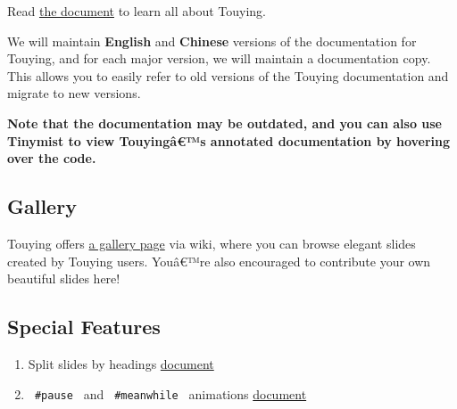Read \href{https://touying-typ.github.io/}{the document} to learn all
about Touying.

We will maintain \textbf{English} and \textbf{Chinese} versions of the
documentation for Touying, and for each major version, we will maintain
a documentation copy. This allows you to easily refer to old versions of
the Touying documentation and migrate to new versions.

\textbf{Note that the documentation may be outdated, and you can also
use Tinymist to view Touyingâ€™s annotated documentation by hovering
over the code.}

\subsection{Gallery}\label{gallery}

Touying offers \href{https://github.com/touying-typ/touying/wiki}{a
gallery page} via wiki, where you can browse elegant slides created by
Touying users. Youâ€™re also encouraged to contribute your own beautiful
slides here!

\subsection{Special Features}\label{special-features}

\begin{enumerate}
\tightlist
\item
  Split slides by headings
  \href{https://touying-typ.github.io/docs/sections}{document}
\end{enumerate}

\begin{Shaded}
\begin{Highlighting}[]





\end{Highlighting}
\end{Shaded}

\begin{enumerate}
\setcounter{enumi}{1}
\tightlist
\item
  \texttt{\ \#pause\ } and \texttt{\ \#meanwhile\ } animations
  \href{https://touying-typ.github.io/docs/dynamic/simple}{document}
\end{enumerate}

